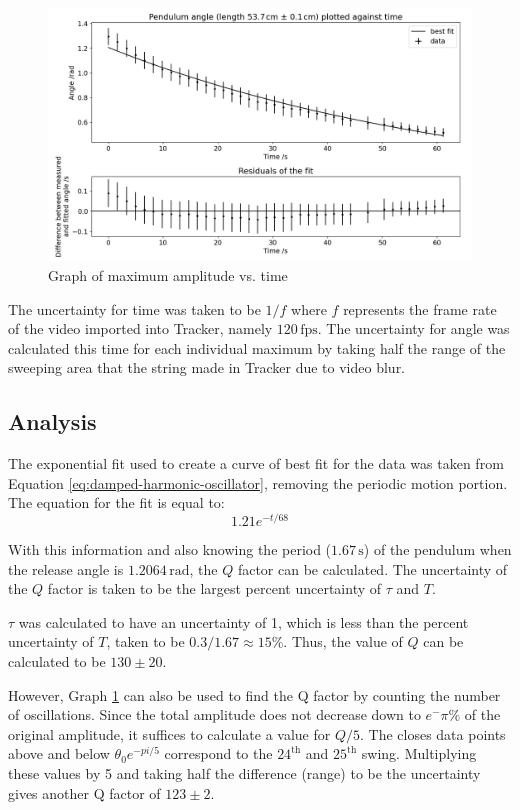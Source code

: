 \documentclass[12pt]{article}
\begin{document}
\begin{figure}[!hptb]
    \centering
    \includegraphics[width=\textwidth]{../figures/max_amplitude_vs_time.png}
    \caption{\centering Graph of maximum amplitude vs. time}
    \label{fig:figure 4}
\end{figure}

The uncertainty for time was taken to be $1/f$ where $f$ represents the frame rate of the video imported into Tracker, namely $120\,\text{fps}$. The uncertainty for angle was calculated this time for each individual maximum by taking half the range of the sweeping area that the string made in Tracker due to video blur.

\subsection{Analysis}
The exponential fit used to create a curve of best fit for the data was taken from Equation \ref{eq:damped-harmonic-oscillator}, removing the periodic motion portion. The equation for the fit is equal to:
\begin{equation}
    1.21e^{-{t}/68}
\end{equation}

With this information and also knowing the period ($1.67\,\text{s}$) of the pendulum when the release angle is $1.2064\,\text{rad}$, the $Q$ factor can be calculated. The uncertainty of the $Q$ factor is taken to be the largest percent uncertainty of $\tau$ and $T$.

$\tau$ was calculated to have an uncertainty of 1, which is less than the percent uncertainty of $T$, taken to be $0.3/1.67 \approx 15\%$. Thus, the value of $Q$ can be calculated to be $130 \pm 20$.

However, Graph \ref{fig:figure 4} can also be used to find the Q factor by counting the number of oscillations. Since the total amplitude does not decrease down to $e^-\pi \%$ of the original amplitude, it suffices to calculate a value for $Q/5$. The closes data points above and below $\theta_0e^{-{pi/5}}$ correspond to the $24^\text{th}$ and $25^\text{th}$ swing. Multiplying these values by 5 and taking half the difference (range) to be the uncertainty gives another Q factor of $123 \pm 2$.

\newpage

\printbibliography
\end{document}
